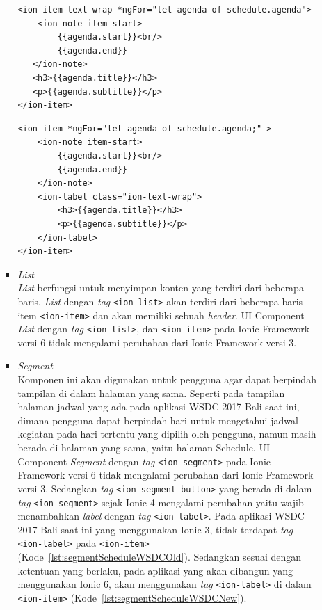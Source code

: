 \begin{enumerate}
\begin{enumerate}
\begin{itemize}
\begin{lstlisting}[label={lst:itemScheduleWSDCOld}, caption=\textit{Tag} <ion-item> dengan Ionic 3 di Aplikasi WSDC 2017 Bali Saat Ini]
<ion-item text-wrap *ngFor="let agenda of schedule.agenda">
	<ion-note item-start>
		{{agenda.start}}<br/>
        {{agenda.end}}
   </ion-note>
   <h3>{{agenda.title}}</h3>
   <p>{{agenda.subtitle}}</p>
</ion-item>
\end{lstlisting}

\begin{lstlisting}[label={lst:itemScheduleWSDCNew}, caption=\textit{Tag} <ion-item> dengan Ionic 6 di Aplikasi WSDC 2017 Bali yang Akan dibuat]
<ion-item *ngFor="let agenda of schedule.agenda;" >
	<ion-note item-start>
    	{{agenda.start}}<br/> 
        {{agenda.end}}
   	</ion-note>
    <ion-label class="ion-text-wrap">
    	<h3>{{agenda.title}}</h3>
        <p>{{agenda.subtitle}}</p>
    </ion-label>
</ion-item>
\end{lstlisting}
			\newpage
			\item \textit{List} \\
			\textit{List} berfungsi untuk menyimpan konten yang terdiri dari beberapa baris. \textit{List} dengan \textit{tag} \texttt{<ion-list>} akan terdiri dari beberapa baris item \texttt{<ion-item>} dan akan memiliki sebuah \textit{header}. UI Component \textit{List} dengan \textit{tag} \texttt{<ion-list>}, dan \texttt{<ion-item>} pada Ionic Framework versi 6 tidak mengalami perubahan dari Ionic Framework versi 3.	
		
			\item \textit{Segment} \\
		Komponen ini akan digunakan untuk pengguna agar dapat berpindah tampilan di dalam halaman yang sama. Seperti pada tampilan halaman jadwal yang ada pada aplikasi WSDC 2017 Bali saat ini, dimana pengguna dapat berpindah hari untuk mengetahui jadwal kegiatan pada hari tertentu yang dipilih oleh pengguna, namun masih berada di halaman yang sama, yaitu halaman Schedule. UI Component \textit{Segment} dengan \textit{tag} \texttt{<ion-segment>} pada Ionic Framework versi 6 tidak mengalami perubahan dari Ionic Framework versi 3.
		Sedangkan \textit{tag} \texttt{<ion-segment-button>} yang berada di dalam \textit{tag} \texttt{<ion-segment>} sejak Ionic 4 mengalami perubahan yaitu wajib menambahkan \textit{label} dengan \textit{tag} \texttt{<ion-label>}. Pada aplikasi WSDC 2017 Bali saat ini yang menggunakan Ionic 3, tidak terdapat \textit{tag} \texttt{<ion-label>} pada \texttt{<ion-item>} (Kode~\ref{lst:segmentScheduleWSDCOld}). Sedangkan sesuai dengan ketentuan yang berlaku, pada aplikasi yang akan dibangun yang menggunakan Ionic 6, akan menggunakan \textit{tag} \texttt{<ion-label>} di dalam \texttt{<ion-item>} (Kode~\ref{lst:segmentScheduleWSDCNew}).
		

\end{itemize}
\end{enumerate}
\end{enumerate}
